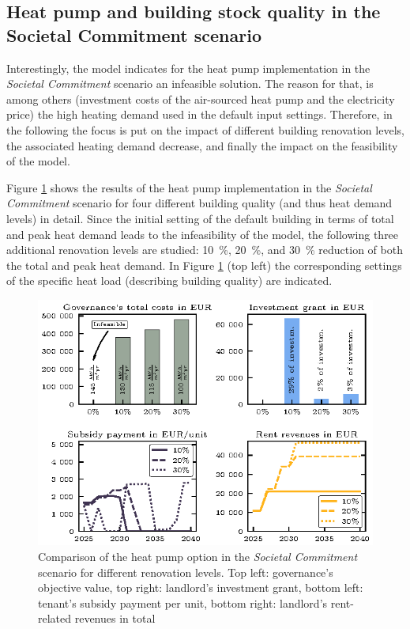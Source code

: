 \subsection{Heat pump and building stock quality in the Societal Commitment scenario}\label{res:heat_pump}
Interestingly, the model indicates for the heat pump implementation in the \textit{Societal Commitment} scenario an infeasible solution. The reason for that, is among others (investment costs of the air-sourced heat pump and the electricity price) the high heating demand used in the default input settings. Therefore, in the following the focus is put on the impact of different building renovation levels, the associated heating demand decrease, and finally the impact on the feasibility of the model.\vspace{0.5cm} 

Figure \ref{fig:retrofitting} shows the results of the heat pump implementation in the \textit{Societal Commitment} scenario for four different building quality (and thus heat demand levels) in detail. Since the initial setting of the default building in terms of total and peak heat demand leads to the infeasibility of the model, the following three additional renovation levels are studied: \SI{10}{\%}, \SI{20}{\%}, and \SI{30}{\%} reduction of both the total and peak heat demand. In Figure \ref{fig:retrofitting} (top left) the corresponding settings of the specific heat load (describing building quality) are indicated.

\begin{figure}[h]
	\centering
	\includegraphics[width=0.9\linewidth]{figures/4_Results/fig_retrofitting/retrofitting.eps}
	\caption{Comparison of the heat pump option in the \textit{Societal Commitment} scenario for different renovation levels. Top left: governance's objective value, top right: landlord's investment grant, bottom left: tenant's subsidy payment per unit, bottom right: landlord's rent-related revenues in total}
	\label{fig:retrofitting}
\end{figure}

